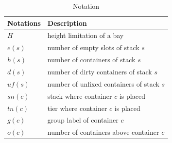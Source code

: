 \documentclass[review,3p,times,authoryear,12pt]{elsarticle}
\begin{document}
\begin{table}[!htb]
  \centering
  \caption{Notation}
  \label{tab:1}
    \begin{tabular}{l|l}
    \hline
    Notations         & Description \\
    \hline
    $H$               &  height limitation of a bay\\
    $e(s)$            &  number of empty slots of stack $s$\\
    $h(s)$            &  number of containers of stack $s$\\
    $d(s)$            &  number of dirty containers of stack $s$\\
    $\mathit{uf}(s)$      &  number of unfixed containers of stack $s$\\
    $\mathit{sn}(c)$      &  stack where container $c$ is placed\\
    $\mathit{tn}(c)$      &  tier where container $c$ is placed\\
    $g(c)$            &  group label of container $c$\\
    $o(c)$          &  number of containers above container $c$\\
    \hline
    \end{tabular}
\end{table}
\end{document}
